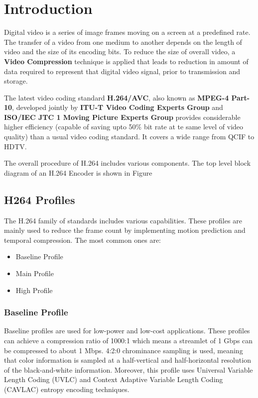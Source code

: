 
\chapter{Introduction} %
\label{Chapter1}

Digital video is a series of image frames moving on a screen at a predefined rate. The transfer of a video from one medium to another depends on the length of video and the size of its encoding bits. To reduce the size of overall video, a \textbf{Video Compression} technique is applied that leads to reduction in amount of data required to represent that digital video signal, prior to transmission and storage. 

The latest video coding standard \textbf{H.264/AVC}, also known as \textbf{MPEG-4 Part-10}, developed jointly by \textbf{ITU-T Video Coding Experts Group} and \textbf{ISO/IEC JTC 1 Moving Picture Experts Group} provides considerable higher efficiency (capable of saving upto 50$\%$ bit rate at te same level of video quality) than a usual video coding standard. It covers a wide range from QCIF to HDTV.  

The overall procedure of H.264 includes various components. The top level block diagram of an H.264 Encoder is shown in Figure
 


\section{H264 Profiles}
The H.264 family of standards includes various capabilities. These profiles are mainly used to reduce the frame count by implementing motion prediction and temporal compression. The most common ones are:

\begin{itemize}
	\item Baseline Profile
	\item Main Profile
	\item High Profile
\end{itemize}

\subsection{Baseline Profile}
Baseline profiles are used for low-power and low-cost applications. These profiles can achieve a compression ratio of 1000:1 which means a streamlet of 1 Gbps can be compressed to about 1 Mbps. 4:2:0 chrominance sampling is used, meaning that color information is sampled at a half-vertical and half-horizontal resolution of the black-and-white information. Moreover, this profile uses Universal Variable Length Coding (UVLC) and Context Adaptive Variable Length Coding (CAVLAC) entropy encoding techniques. 

